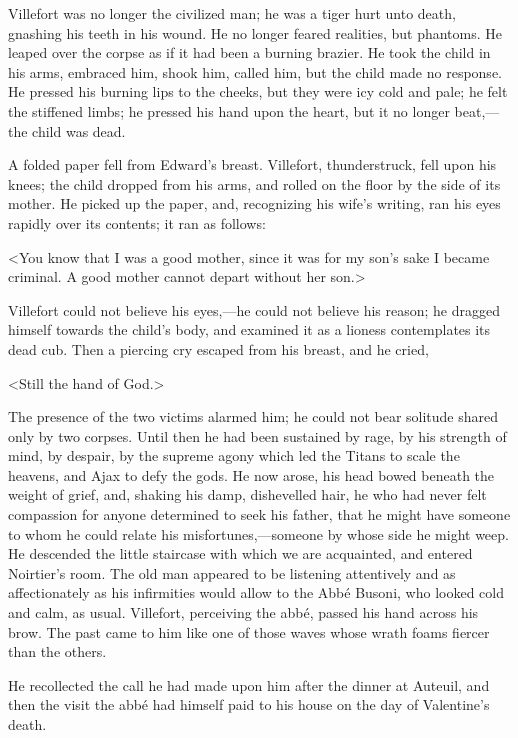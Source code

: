  Villefort was no longer the civilized man; he was a tiger hurt unto death, gnashing his teeth in his wound. He no longer feared realities, but phantoms. He leaped over the corpse as if it had been a burning brazier. He took the child in his arms, embraced him, shook him, called him, but the child made no response. He pressed his burning lips to the cheeks, but they were icy cold and pale; he felt the stiffened limbs; he pressed his hand upon the heart, but it no longer beat,—the child was dead. 

 A folded paper fell from Edward's breast. Villefort, thunderstruck, fell upon his knees; the child dropped from his arms, and rolled on the floor by the side of its mother. He picked up the paper, and, recognizing his wife's writing, ran his eyes rapidly over its contents; it ran as follows: 

 <You know that I was a good mother, since it was for my son's sake I became criminal. A good mother cannot depart without her son.> 

 Villefort could not believe his eyes,—he could not believe his reason; he dragged himself towards the child's body, and examined it as a lioness contemplates its dead cub. Then a piercing cry escaped from his breast, and he cried, 

 <Still the hand of God.> 

 The presence of the two victims alarmed him; he could not bear solitude shared only by two corpses. Until then he had been sustained by rage, by his strength of mind, by despair, by the supreme agony which led the Titans to scale the heavens, and Ajax to defy the gods. He now arose, his head bowed beneath the weight of grief, and, shaking his damp, dishevelled hair, he who had never felt compassion for anyone determined to seek his father, that he might have someone to whom he could relate his misfortunes,—someone by whose side he might weep.  He descended the little staircase with which we are acquainted, and entered Noirtier's room. The old man appeared to be listening attentively and as affectionately as his infirmities would allow to the Abbé Busoni, who looked cold and calm, as usual. Villefort, perceiving the abbé, passed his hand across his brow. The past came to him like one of those waves whose wrath foams fiercer than the others. 

 He recollected the call he had made upon him after the dinner at Auteuil, and then the visit the abbé had himself paid to his house on the day of Valentine's death. 

